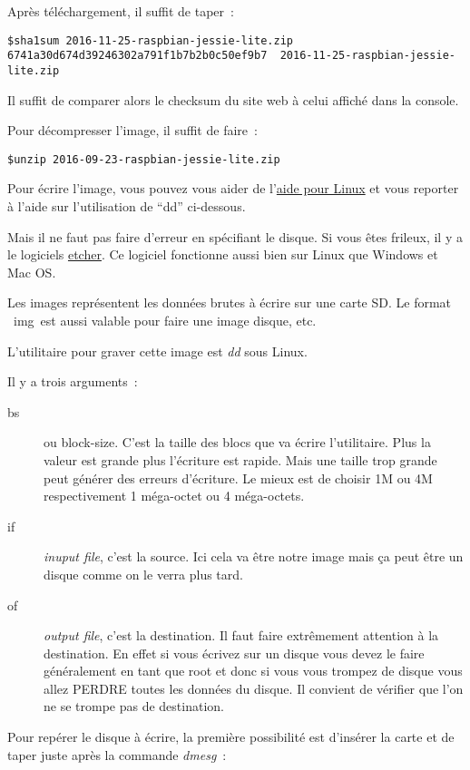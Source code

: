 Après téléchargement, il suffit de taper~:
\begin{verbatim}
$sha1sum 2016-11-25-raspbian-jessie-lite.zip 
6741a30d674d39246302a791f1b7b2b0c50ef9b7  2016-11-25-raspbian-jessie-lite.zip
\end{verbatim}

Il suffit de comparer alors le checksum du 	site web à celui affiché dans la console.

Pour décompresser l'image, il suffit de faire~: 

\begin{verbatim}
$unzip 2016-09-23-raspbian-jessie-lite.zip
\end{verbatim}

Pour écrire l'image, vous pouvez vous aider de l'\href{https://www.raspberrypi.org/documentation/installation/installing-images/linux.md}{aide pour Linux} et vous reporter à l'aide sur l'utilisation de ``dd'' ci-dessous.

Mais il ne faut pas faire d'erreur en spécifiant le disque. Si vous êtes frileux, il y a le logiciels \href{http://etcher.io/}{etcher}. Ce logiciel fonctionne aussi bien sur Linux que Windows et Mac OS.

Les images représentent les données brutes à écrire sur une carte SD. Le format \og~img~\fg est aussi valable pour faire une image disque, etc.

L'utilitaire pour graver cette image est \emph{dd} sous Linux.

Il y a trois arguments~:
\begin{description}
	\item[bs] ou block-size. C'est la taille des blocs que va écrire l'utilitaire. Plus la valeur est grande plus l'écriture est rapide. Mais une taille trop grande peut générer des erreurs d'écriture. Le mieux est de choisir 1M ou 4M respectivement 1 méga-octet ou 4 méga-octets.
	\item[if] \emph{inuput file}, c'est la source. Ici cela va être notre image mais ça peut être un disque comme on le verra plus tard.
	\item[of] \emph{output file}, c'est la destination. Il faut faire extrêmement attention à la destination. En effet si vous écrivez sur un disque vous devez le faire généralement en tant que root et donc si vous vous trompez de disque vous allez PERDRE toutes les données du disque. Il convient de vérifier que l'on ne se trompe pas de destination.
\end{description}

Pour repérer le disque à écrire, la première possibilité est d'insérer la carte et de taper juste après la commande \emph{dmesg}~:

